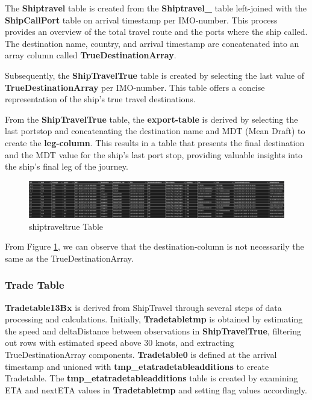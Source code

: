 The \textbf{Shiptravel} table is created from the \textbf{Shiptravel\_} table left-joined with the \textbf{ShipCallPort} table on arrival timestamp per IMO-number. This process provides an overview of the total travel route and the ports where the ship called. The destination name, country, and arrival timestamp are concatenated into an array column called \textbf{TrueDestinationArray}.

Subsequently, the \textbf{ShipTravelTrue} table is created by selecting the last value of \textbf{TrueDestinationArray} per IMO-number. This table offers a concise representation of the ship's true travel destinations.

From the \textbf{ShipTravelTrue} table, the \textbf{export-table} is derived by selecting the last portstop and concatenating the destination name and MDT (Mean Draft) to create the \textbf{leg-column}. This results in a table that presents the final destination and the MDT value for the ship's last port stop, providing valuable insights into the ship's final leg of the journey.

\begin{figure}[h]
    \centering
    \includegraphics[width=1\textwidth]{images/ship_travel.png}
    \caption{shiptraveltrue Table}
    \label{ship_travel}
\end{figure}

From Figure \ref{ship_travel}, we can observe that the destination-column is not necessarily the same as the TrueDestinationArray.

\subsubsection{Trade Table}

\textbf{Tradetable13Bx} is derived from ShipTravel through several steps of data processing and \newline calculations.
Initially, \textbf{Tradetabletmp} is obtained by estimating the speed and deltaDistance between observations in \textbf{ShipTravelTrue},
filtering out rows with estimated speed above 30 knots, and extracting TrueDestinationArray components.
\textbf{Tradetable0} is defined at the arrival timestamp and unioned with \textbf{tmp\_etatradetableadditions} to create Tradetable.
The \textbf{tmp\_etatradetableadditions} table is created by examining ETA and nextETA values in \newline \textbf{Tradetabletmp} and setting flag values accordingly.

